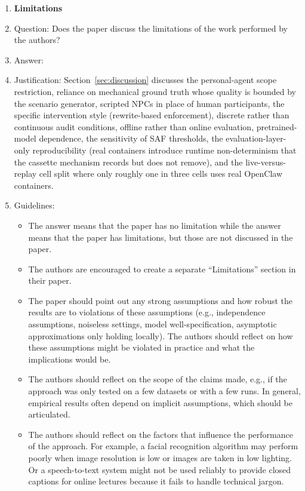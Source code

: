 \begin{enumerate}
\item {\bf Limitations}
    \item[] Question: Does the paper discuss the limitations of the work performed by the authors?
    \item[] Answer: \answerYes{}
    \item[] Justification: Section~\ref{sec:discussion} discusses the personal-agent scope restriction, reliance on mechanical ground truth whose quality is bounded by the scenario generator, scripted NPCs in place of human participants, the specific intervention style (rewrite-based enforcement), discrete rather than continuous audit conditions, offline rather than online evaluation, pretrained-model dependence, the sensitivity of SAF thresholds, the evaluation-layer-only reproducibility (real containers introduce runtime non-determinism that the cassette mechanism records but does not remove), and the live-versus-replay cell split where only roughly one in three cells uses real OpenClaw containers.
    \item[] Guidelines:
    \begin{itemize}
        \item The answer \answerNA{} means that the paper has no limitation while the answer \answerNo{} means that the paper has limitations, but those are not discussed in the paper.
        \item The authors are encouraged to create a separate ``Limitations'' section in their paper.
        \item The paper should point out any strong assumptions and how robust the results are to violations of these assumptions (e.g., independence assumptions, noiseless settings, model well-specification, asymptotic approximations only holding locally). The authors should reflect on how these assumptions might be violated in practice and what the implications would be.
        \item The authors should reflect on the scope of the claims made, e.g., if the approach was only tested on a few datasets or with a few runs. In general, empirical results often depend on implicit assumptions, which should be articulated.
        \item The authors should reflect on the factors that influence the performance of the approach. For example, a facial recognition algorithm may perform poorly when image resolution is low or images are taken in low lighting. Or a speech-to-text system might not be used reliably to provide closed captions for online lectures because it fails to handle technical jargon.

\end{itemize}
\end{enumerate}
